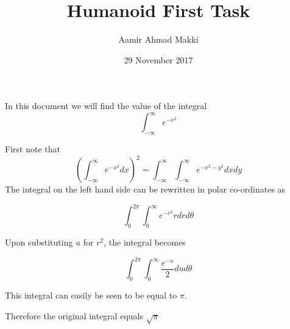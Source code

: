 \documentclass{article}
\title{Humanoid First Task}
\author{Aamir Ahmad Makki }
\date{29 November 2017}
\begin{document}
\maketitle
In this document we will find the value of the integral $$\int_{-{\infty}}^{{\infty}} {e^{-x^2}} $$

First note that
$$({\int_{-{\infty}}^{{\infty}} {e^{-x^2}} dx})^2 = \int_{-{\infty}}^{{\infty}}\int_{-{\infty}}^{{\infty}} {e^{-{x^2}-{y^2}}}dxdy$$
The integral on the left hand side can be rewritten in polar co-ordinates as

$$\int_{{0}}^{{2\pi}} \int_{0}^{{\infty}}{e^{-r^2}}rdrd\theta$$

Upon substituting $u$ for $r^2$, the integral becomes

$$\int_{{0}}^{{2\pi}} \int_{0}^{{\infty}}\frac{e^{-u}}{2}dud\theta$$

This integral can easily be seen to be equal to $\pi$.


Therefore the original integral equals $\sqrt{\pi}$
\end{document}
